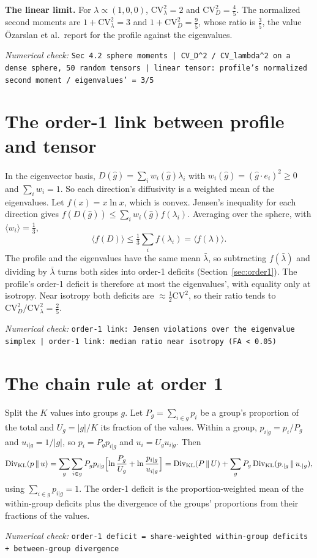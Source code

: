 \documentclass[11pt]{article}
\newcommand{\Div}{\mathrm{Div}}
\newcommand{\KL}{\Div_{\mathrm{KL}}}
\newcommand{\CV}{\mathrm{CV}}
\newcommand{\numcheck}[1]{\par{\small\raggedright\noindent\textit{Numerical check:} \texttt{#1}\par}}
\begin{document}
\textbf{The linear limit.} For $\lambda\propto(1,0,0)$, $\CV_\lambda^2 = 2$ and $\CV_D^2 = \tfrac45$. The normalized
second moments are $1+\CV_\lambda^2 = 3$ and $1+\CV_D^2 = \tfrac95$, whose ratio is $\tfrac35$, the value
\"Ozarslan et al.\ report for the profile against the eigenvalues.
\numcheck{Sec 4.2 sphere moments | CV\_D\^{}2 / CV\_lambda\^{}2 on a dense sphere, 50 random tensors | linear tensor: profile's normalized second moment / eigenvalues' = 3/5}

\section{The order-1 link between profile and tensor}

In the eigenvector basis, $D(\hat g) = \sum_iw_i(\hat g)\lambda_i$ with $w_i(\hat g) = (\hat g\cdot e_i)^2\ge0$ and
$\sum_iw_i = 1$. So each direction's diffusivity is a weighted mean of the eigenvalues. Let $f(x) = x\ln x$, which is
convex. Jensen's inequality for each direction gives $f(D(\hat g)) \le \sum_iw_i(\hat g)f(\lambda_i)$. Averaging over the
sphere, with $\langle w_i\rangle = \tfrac13$,
\begin{equation}
\langle f(D)\rangle \le \tfrac13\textstyle\sum_if(\lambda_i) = \langle f(\lambda)\rangle .
\end{equation}
The profile and the eigenvalues have the same mean $\bar\lambda$, so subtracting $f(\bar\lambda)$ and dividing by
$\bar\lambda$ turns both sides into order-1 deficits (Section~\ref{sec:order1}). The profile's order-1 deficit is
therefore at most the eigenvalues', with equality only at isotropy. Near isotropy both deficits are
$\approx\tfrac12\CV^2$, so their ratio tends to $\CV_D^2/\CV_\lambda^2 = \tfrac25$.
\numcheck{order-1 link: Jensen violations over the eigenvalue simplex | order-1 link: median ratio near isotropy (FA < 0.05)}

\section{The chain rule at order 1}

Split the $K$ values into groups $g$. Let $P_g = \sum_{i\in g}p_i$ be a group's proportion of the total and
$U_g = |g|/K$ its fraction of the values. Within a group, $p_{i|g} = p_i/P_g$ and $u_{i|g} = 1/|g|$, so
$p_i = P_gp_{i|g}$ and $u_i = U_gu_{i|g}$. Then
\begin{equation}
\KL(p\,\|\,u) = \sum_g\sum_{i\in g}P_gp_{i|g}\Bigl[\ln\frac{P_g}{U_g} + \ln\frac{p_{i|g}}{u_{i|g}}\Bigr]
= \KL(P\,\|\,U) + \sum_gP_g\,\KL(p_{\cdot|g}\,\|\,u_{\cdot|g}) ,
\end{equation}
using $\sum_{i\in g}p_{i|g} = 1$. The order-1 deficit is the proportion-weighted mean of the within-group deficits
plus the divergence of the groups' proportions from their fractions of the values.
\numcheck{order-1 deficit = share-weighted within-group deficits + between-group divergence}
\end{document}
